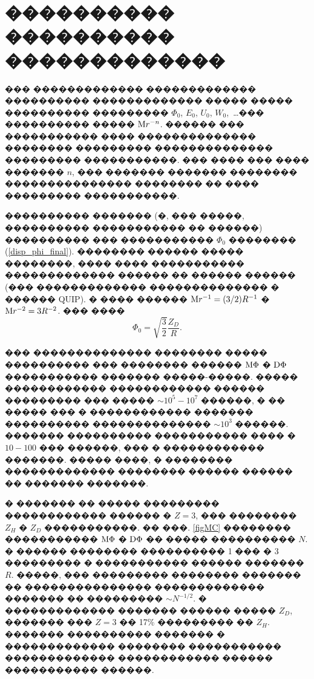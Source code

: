 \documentclass[12pt,titlepage]{article}
\newcommand\M{{\rm M}} %
\newcommand\D{{\rm D}}
\begin{document}
\section{���������� ���������� �������������}

��� ������������� ������������� ���������� ������������� ����� ����� ���������� ��������� $\Phi_0$, $E_0$, $U_0$, $W_0$,~\dots ��� ���������� ����� $\M r^{-n}$.
������ ��� ����������� ���� �������������� �������� ��������� �������������� ��������� �����������. ��� ���� ��� ���� ������� $n$, ��� ������� ������� �������� ��������������� �������� �� ���� ��������� �����������.

���������� ������� (�, ��� �����, ���������� ����������� �� ������) ���������� ��� ����������� $\Phi_0$ �������� (\ref{disp_phi_final}). �������� ������ ����� ��������, ���� ���� ����������� ������������� ������ �� ������ ������ (��� ������������� �������������� � ������ QUIP). � ���� ������ $\M r^{-1} = (3/2) R^{-1}$ � $\M r^{-2} = 3 R^{-2}$. ��� ����
\begin{equation}
    \Phi_0 = \sqrt{ \frac{3}{2} } \frac{Z_D}{R}.
\end{equation}

��� �������������� �������� ����� ���������� ��� �������� ������ $\M \Phi$ � $\D \Phi$ ����������� ������� �����-�����. ����� ������������ ������������ ������ ��������� ��� ����� $\sim10^5 - 10^7$ ������, � �� ����� ��� � ������������ ������� ���������� �������������� $\sim10^3$ ������. ������� ���������� ����������� ���� � $10-100$ ��� ������, ��� � ������������ �������. ����� ����, � �������� ������������� �������� ������ ������ �� ������� �������.

� ������� �� ����� ��������� ������������ ������ � $Z = 3$, ��� �������� $Z_H$ � $Z_D$ �����������. �� ���. \ref{figMC} �������� ����������� $\M \Phi$ � $\D \Phi$ �� ����� ���������� $N$. � ������ �������� ���������� 1 ��� � 3 ��������� � ����������� ������ ������� $R$. �����, ��� ��������� �������� ������� �� ��������������� ������������� ������� �� ��������� $\sim N^{-1/2}$. � ������������� ������� ������ ����� $Z_D$, ������� ��� $Z = 3$ �� 17\%
��������� �� $Z_H$. ������� ���������� ������� � ������������� �������� ����������� ������������� ������������ ������ ����������� ������.
\end{document}

